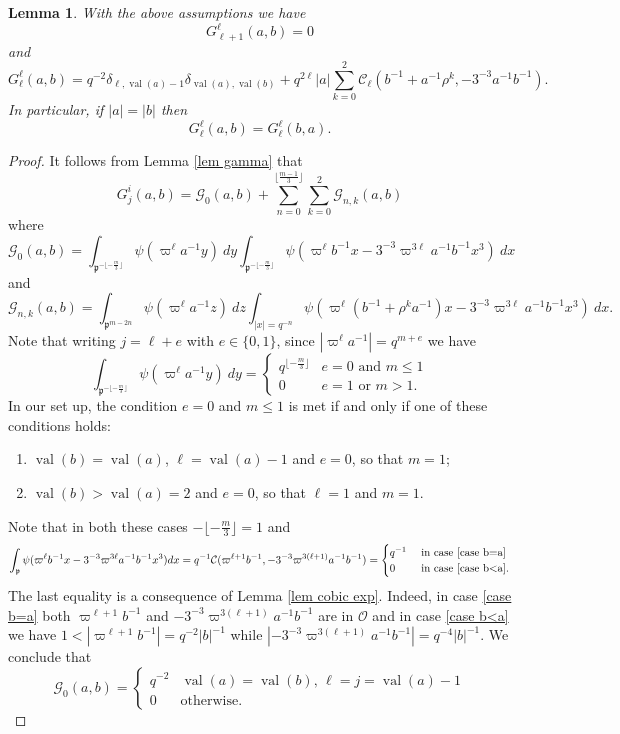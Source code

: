 \documentclass[12pt]{amsart}
\newcommand{\abs}[1]{\left|{#1}\right|}
\newcommand{\p}{\mathfrak{p}}
\renewcommand{\O}{\mathcal{O}}
\newcommand{\G}{\mathcal{G}}
\newcommand{\val}{{\operatorname{val}}}
\newcommand{\Cu}{\mathcal{C}}
\newtheorem{lemma}[theorem]{Lemma}
\theoremstyle{remark}
\begin{document}
\begin{lemma}\label{lem G comp}
With the above assumptions we have
\[
G_{\ell+1}^\ell(a,b)=0
\]
and
\[
G_\ell^\ell(a,b)=q^{-2}\delta_{\ell,\val(a)-1}\delta_{\val(a),\val(b)}+q^{2\ell}\abs{a}\sum_{k=0}^2 \Cu_\ell(b^{-1}+a^{-1}\rho^k,-3^{-3}a^{-1}b^{-1}).
\]
In particular, if $\abs{a}=\abs{b}$ then
\[
G_\ell^\ell(a,b)=G_\ell^\ell(b,a).
\]
\end{lemma}
\begin{proof}
It follows from Lemma \ref{lem gamma} that
\[
G_j^i(a,b)=\G_0(a,b)+\sum_{n=0}^{\lfloor\frac{m-1}3\rfloor}\sum_{k=0}^2 \G_{n,k}(a,b)
\]
where
\[
\G_0(a,b)=\int_{\p^{-\lfloor -\frac{m}3\rfloor}}\psi(\varpi^\ell  a^{-1} y)\ dy
\int_{\p^{-\lfloor -\frac{m}3\rfloor}}\psi(\varpi^\ell b^{-1} x-3^{-3}\varpi^{3\ell}a^{-1}b^{-1}x^3)\ dx
\]
and
\[
\G_{n,k}(a,b)=\int_{\p^{m-2n}}\psi(\varpi^\ell a^{-1}z)\ dz\int_{\abs{x}=q^{-n}} \psi(\varpi^\ell (b^{-1}+\rho^k a^{-1}) x-3^{-3}\varpi^{3\ell}a^{-1}b^{-1}x^3)\ dx.
\]
Note that writing $j=\ell+e$ with $e\in \{0,1\}$, since $\abs{\varpi^\ell a^{-1}}=q^{m+e}$ we have
\[
\int_{\p^{-\lfloor -\frac{m}3\rfloor}}\psi(\varpi^\ell  a^{-1}  y)\ dy=\begin{cases} q^{\lfloor -\frac{m}3\rfloor} & e=0\text{ and }m\le 1 \\ 0 &  e=1\text{ or }m>1. \end{cases}
\]
In our set up, the condition $e=0$ and $m\le 1$ is met if and only if one of these conditions holds:
\begin{enumerate}
\item\label{case b=a} $\val(b)=\val(a)$, $\ell=\val(a)-1$ and $e=0$, so that $m=1$;
\item\label{case b<a} $\val(b)>\val(a)=2$ and $e=0$, so that $\ell=1$ and $m=1$.
\end{enumerate}
Note that in both these cases $-\lfloor -\frac{m}3\rfloor=1$ and 
\[
\int_\p \psi(\varpi^\ell b^{-1} x-3^{-3}\varpi^{3\ell}a^{-1}b^{-1}x^3)\\ dx=q^{-1}\Cu(\varpi^{\ell+1}b^{-1},-3^{-3}\varpi^{3(\ell+1)}a^{-1}b^{-1})=\begin{cases} q^{-1} &  \text{ in case }\eqref{case b=a} \\ 0 & \text{ in case }\eqref{case b<a}.\end{cases}
\]
The last equality is a consequence of Lemma \ref{lem cobic exp}. Indeed, in case \eqref{case b=a} both $\varpi^{\ell+1}b^{-1}$ and $-3^{-3}\varpi^{3(\ell+1)}a^{-1}b^{-1}$ are in $\O$ and in case \eqref{case b<a} we have $1<\abs{\varpi^{\ell+1}b^{-1}}=q^{-2}\abs{b}^{-1}$ while $\abs{-3^{-3}\varpi^{3(\ell+1)}a^{-1}b^{-1}}=q^{-4}\abs{b}^{-1}$.
We conclude that
\[
\G_0(a,b)=\begin{cases} q^{-2} & \val(a)=\val(b), \,\ell=j=\val(a)-1 \\ 0 & \text{otherwise.}\end{cases}
\]


\end{proof}
\end{document}
